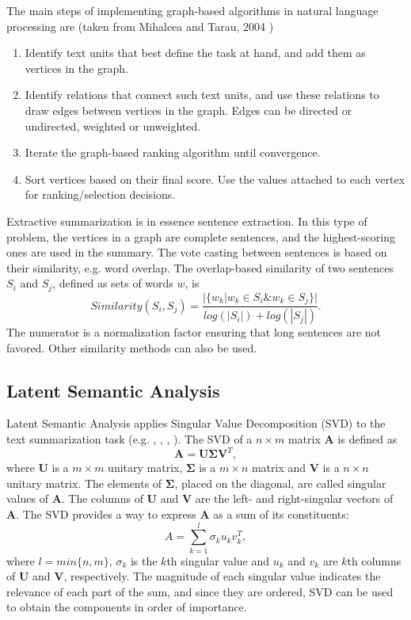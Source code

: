 \documentclass[conference]{IEEEtran}
\begin{document}
The main steps of implementing graph-based algorithms in natural language processing are (taken from Mihalcea and Tarau, 2004 \cite{mihalcea2004})
\begin{enumerate}
	\item Identify text units that best define the task at hand,
	and add them as vertices in the graph.
	\item Identify relations that connect such text units, and
	use these relations to draw edges between vertices
	in the graph. Edges can be directed or undirected,
	weighted or unweighted.
	\item Iterate the graph-based ranking algorithm until convergence.
	\item Sort vertices based on their final score. Use the values
	attached to each vertex for ranking/selection decisions.
\end{enumerate}

Extractive summarization is in essence sentence extraction. In this type of problem, the vertices in a graph are complete sentences, and the highest-scoring ones are used in the summary. The vote casting between sentences is based on their similarity, e.g. word overlap. The overlap-based similarity of two sentences $S_i$ and $S_j$, defined as sets of words $w$, is \cite{mihalcea2004}
\begin{equation}
Similarity(S_i,S_j) = \frac{|\{w_k|w_k \in S_i \& w_k \in S_j\}|}{log(|S_i|)+log(|S_j|)}.
\end{equation}
The numerator is a normalization factor ensuring that long sentences are not favored. Other similarity methods can also be used.

\subsection{Latent Semantic Analysis}
Latent Semantic Analysis applies Singular Value Decomposition (SVD) to the text summarization task (e.g. \cite{ozsoy2010}, \cite{ozsoy2011}, \cite{steinberger2004}, \cite{gong2001}). The SVD of a $n \times m$ matrix $\mathbf{A}$ is defined as
\begin{equation}
\mathbf{A} = \mathbf{U} \mathbf{\Sigma} \mathbf{V}^T,
\end{equation}
where $\mathbf{U}$ is a $m \times m$ unitary matrix, $\mathbf{\Sigma}$ is a $m \times n$ matrix and $\mathbf{V}$ is a $n \times n$ unitary matrix. The elements of $\mathbf{\Sigma}$, placed on the diagonal, are called singular values of $\mathbf{A}$. The columns of $\mathbf{U}$ and $\mathbf{V}$ are the left- and right-singular vectors of $\mathbf{A}$.  
The SVD provides a way to express $\mathbf{A}$ as a sum of its constituents:
\begin{equation}
A = \sum \limits_{k=1}^{l} \sigma_k u_k v_k^T,
\end{equation} 
where $l=min\{n,m\}$, $\sigma_k$ is the $k$th singular value and $u_k$ and $v_k$ are $k$th columns of $\mathbf{U}$ and $\mathbf{V}$, respectively. The magnitude of each singular value indicates the relevance of each part of the sum, and since they are ordered, SVD can be used to obtain the components in order of importance.
\end{document}
